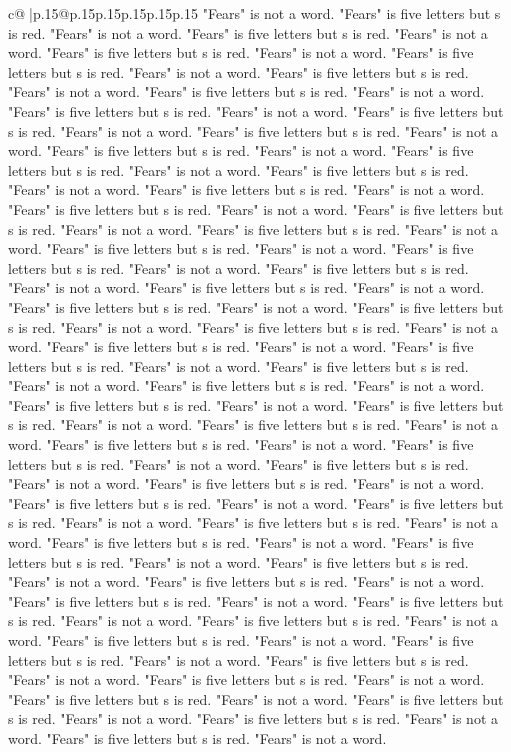 \documentclass{article}
\begin{document}
{\begin{supertabular}{c@{$\;$}|p{.15\linewidth}@{}p{.15\linewidth}p{.15\linewidth}p{.15\linewidth}p{.15\linewidth}p{.15\linewidth}}
{{{"Fears" is not a word. "Fears" is five letters but s is red. "Fears" is not a word. "Fears" is five letters but s is red. "Fears" is not a word. "Fears" is five letters but s is red. "Fears" is not a word. "Fears" is five letters but s is red. "Fears" is not a word. "Fears" is five letters but s is red. "Fears" is not a word. "Fears" is five letters but s is red. "Fears" is not a word. "Fears" is five letters but s is red. "Fears" is not a word. "Fears" is five letters but s is red. "Fears" is not a word. "Fears" is five letters but s is red. "Fears" is not a word. "Fears" is five letters but s is red. "Fears" is not a word. "Fears" is five letters but s is red. "Fears" is not a word. "Fears" is five letters but s is red. "Fears" is not a word. "Fears" is five letters but s is red. "Fears" is not a word. "Fears" is five letters but s is red. "Fears" is not a word. "Fears" is five letters but s is red. "Fears" is not a word. "Fears" is five letters but s is red. "Fears" is not a word. "Fears" is five letters but s is red. "Fears" is not a word. "Fears" is five letters but s is red. "Fears" is not a word. "Fears" is five letters but s is red. "Fears" is not a word. "Fears" is five letters but s is red. "Fears" is not a word. "Fears" is five letters but s is red. "Fears" is not a word. "Fears" is five letters but s is red. "Fears" is not a word. "Fears" is five letters but s is red. "Fears" is not a word. "Fears" is five letters but s is red. "Fears" is not a word. "Fears" is five letters but s is red. "Fears" is not a word. "Fears" is five letters but s is red. "Fears" is not a word. "Fears" is five letters but s is red. "Fears" is not a word. "Fears" is five letters but s is red. "Fears" is not a word. "Fears" is five letters but s is red. "Fears" is not a word. "Fears" is five letters but s is red. "Fears" is not a word. "Fears" is five letters but s is red. "Fears" is not a word. "Fears" is five letters but s is red. "Fears" is not a word. "Fears" is five letters but s is red. "Fears" is not a word. "Fears" is five letters but s is red. "Fears" is not a word. "Fears" is five letters but s is red. "Fears" is not a word. "Fears" is five letters but s is red. "Fears" is not a word. "Fears" is five letters but s is red. "Fears" is not a word. "Fears" is five letters but s is red. "Fears" is not a word. "Fears" is five letters but s is red. "Fears" is not a word. "Fears" is five letters but s is red. "Fears" is not a word. "Fears" is five letters but s is red. "Fears" is not a word. "Fears" is five letters but s is red. "Fears" is not a word. "Fears" is five letters but s is red. "Fears" is not a word. "Fears" is five letters but s is red. "Fears" is not a word. "Fears" is five letters but s is red. "Fears" is not a word. "Fears" is five letters but s is red. "Fears" is not a word. "Fears" is five letters but s is red. "Fears" is not a word. "Fears" is five letters but s is red. "Fears" is not a word. "Fears" is five letters but s is red. "Fears" is not a word. "Fears" is five letters but s is red. "Fears" is not a word. "Fears" is five letters but s is red. "Fears" is not a word. "Fears" is five letters but s is red. "Fears" is not a word. }}}
\end{supertabular}}
\end{document}

